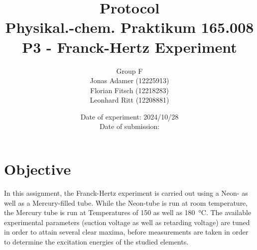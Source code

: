 \documentclass[titlepage]{article}
\title{Protocol \\ Physikal.-chem. Praktikum 165.008 \\ P3 - Franck-Hertz Experiment}
\author{Group F\\Jonas Adamer (12225913)\\Florian Fitsch (12218283)\\Leonhard Ritt (12208881)}
\date{Date of experiment: 2024/10/28\\Date of submission:}
\begin{document}
\maketitle
\thispagestyle{empty}

\newpage
\tableofcontents
\thispagestyle{empty}

\addtocounter{page}{-1}

\newpage
\section{Objective}
In this assignment, the Franck-Hertz experiment is carried out using a Neon- as well as a Mercury-filled tube. While the Neon-tube is run at room temperature, the Mercury tube is run at Temperatures of 150 as well as 180~°C. The available experimental parameters (suction voltage as well as retarding voltage) are tuned in order to attain several clear maxima, before measurements are taken in order to determine the excitation energies of the studied elements.
\end{document}
